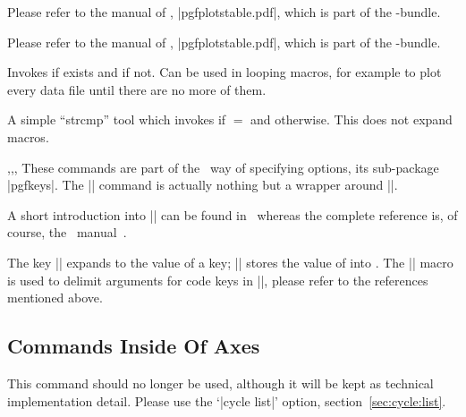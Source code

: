\begin{command}{\pgfplotstableread{}}
	Please refer to the manual of \PGFPlotstable, |pgfplotstable.pdf|, which is part of the \PGFPlots-bundle.
\end{command}
\begin{command}{\pgfplotstabletypeset{}}
	Please refer to the manual of \PGFPlotstable, |pgfplotstable.pdf|, which is part of the \PGFPlots-bundle.
\end{command}

\begin{command}{\pgfplotsiffileexists{}}
	Invokes  if  exists and  if not. Can be used in looping macros, for example to plot every data file until there are no more of them.
\end{command}
\begin{command}{\pgfplotsutilifstringequal{}}
	A simple ``strcmp'' tool which invokes  if  $=$ and  otherwise. This does not expand macros.
\end{command}


\begin{commandlist}{\pgfkeys,\pgfeov,\pgfkeysvalueof,\pgfkeysgetvalue}
	These commands are part of the \Tikz\ way of specifying options, its sub-package |pgfkeys|. The |\pgfplotsset| command is actually nothing but a wrapper around |\pgfkeys|.

	A short introduction into |\pgfkeys| can be found in~\cite{keyvalintro} whereas the complete reference is, of course, the \Tikz\ manual~\cite{tikz}.

	The key |\pgfkeysvalueof| expands to the value of a key; |\pgfkeysgetvalue| stores the value of  into . The |\pgfeov| macro is used to delimit arguments for code keys in |\pgfkeys|, please refer to the references mentioned above.
\end{commandlist}

\subsection[Commands Inside Of PGFPlots Axes]{Commands Inside Of {\normalfont\PGFPlots} Axes}
\begin{command}{\autoplotspeclist}
This command should no longer be used, although it will be kept as technical implementation detail. Please use the `|cycle list|' option, section~\ref{sec:cycle:list}.
\end{command}

